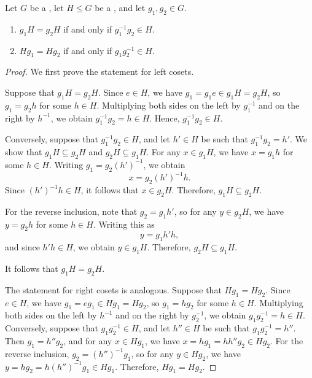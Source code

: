 \begin{lemma}  \label{lemma:cosets_are_equal_iff_product_of_elements_is_in_subgroup}
	Let $G$ be a , let $H \leq G$ be a , and let $g_1, g_2 \in G$.
	\begin{enumerate}
	    \item $g_1 H = g_2 H $ if and only if $g_1^{-1} g_2 \in H$.
	    \item $H g_1 = H g_2$ if and only if $g_1 g_2^{-1} \in H$.
	\end{enumerate}
\end{lemma}

\begin{proof}
	We first prove the statement for left cosets.

	Suppose that $g_1 H = g_2 H$. Since $e \in H$, we have $g_1 = g_1 e \in g_1 H = g_2 H$, so $g_1 = g_2 h$ for some $h \in H$. Multiplying both sides on the left by $g_1^{-1}$ and on the right by $h^{-1}$, we obtain $g_1^{-1} g_2 = h \in H$. Hence, $g_1^{-1} g_2 \in H$.

	Conversely, suppose that $g_1^{-1} g_2 \in H$, and let $h' \in H$ be such that $g_1^{-1} g_2 = h'$. We show that $g_1 H \subseteq g_2 H$ and $g_2 H \subseteq g_1 H$. For any $x \in g_1 H$, we have $x = g_1 h$ for some $h \in H$. Writing $g_1 = g_2 (h')^{-1}$, we obtain
	$$x = g_2 (h')^{-1} h.$$
	Since $(h')^{-1} h \in H$, it follows that $x \in g_2 H$. Therefore, $g_1 H \subseteq g_2 H$.

	For the reverse inclusion, note that $g_2 = g_1 h'$, so for any $y \in g_2 H$, we have $y = g_2 h$ for some $h \in H$. Writing this as
	$$y = g_1 h' h,$$
	and since $h' h \in H$, we obtain $y \in g_1 H$. Therefore, $g_2 H \subseteq g_1 H$.

	It follows that $g_1 H = g_2 H$.

	The statement for right cosets is analogous. Suppose that $H g_1 = H g_2$. Since $e \in H$, we have $g_1 = e g_1 \in H g_1 = H g_2$, so $g_1 = h g_2$ for some $h \in H$. Multiplying both sides on the left by $h^{-1}$ and on the right by $g_2^{-1}$, we obtain $g_1 g_2^{-1} = h \in H$. Conversely, suppose that $g_1 g_2^{-1} \in H$, and let $h'' \in H$ be such that $g_1 g_2^{-1} = h''$. Then $g_1 = h'' g_2$, and for any $x \in H g_1$, we have $x = h g_1 = h h'' g_2 \in H g_2$. For the reverse inclusion, $g_2 = (h'')^{-1} g_1$, so for any $y \in H g_2$, we have $y = h g_2 = h (h'')^{-1} g_1 \in H g_1$. Therefore, $H g_1 = H g_2$.
\end{proof}